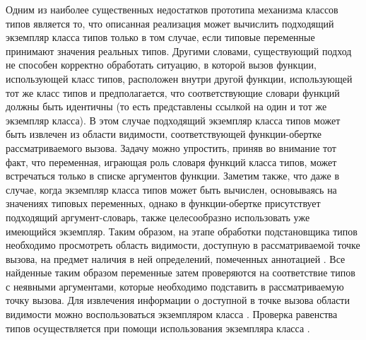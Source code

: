 Одним из наиболее существенных недостатков прототипа механизма классов типов является то, что описанная реализация может вычислить подходящий экземпляр класса типов только в том случае, если типовые переменные принимают значения реальных типов. Другими словами, существующий подход не способен корректно обработать ситуацию, в которой вызов функции, использующей класс типов, расположен внутри другой функции, использующей тот же класс типов и предполагается, что соответствующие словари функций должны быть идентичны (то есть представлены ссылкой на один и тот же экземпляр класса). В этом случае подходящий экземпляр класса типов может быть извлечен из области видимости, соответствующей функции-обертке рассматриваемого вызова. Задачу можно упростить, приняв во внимание тот факт, что переменная, играющая роль словаря функций класса типов, может встречаться только в списке аргументов функции. Заметим также, что даже в случае, когда экземпляр класса типов может быть вычислен, основываясь на значениях типовых переменных, однако в функции-обертке присутствует подходящий аргумент-словарь, также целесообразно использовать уже имеющийся экземпляр. Таким образом, на этапе обработки подстановщика типов необходимо просмотреть область видимости, доступную в рассматриваемой точке вызова, на предмет наличия в ней определений, помеченных аннотацией . Все найденные таким образом переменные затем проверяются на соответствие типов с неявными аргументами, которые необходимо подставить в рассматриваемую точку вызова. Для извлечения информации о доступной в точке вызова области видимости можно воспользоваться экземпляром класса . Проверка равенства типов осуществляется при помощи использования экземпляра класса .


